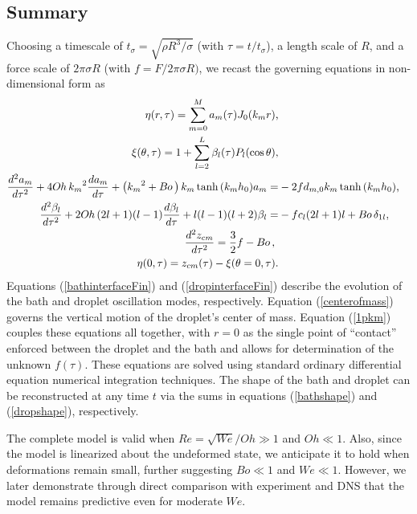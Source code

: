 \documentclass{jfm}
\begin{document}
\subsection{Summary}
Choosing a timescale of $t_{\sigma}=\sqrt{\rho R^3/\sigma}$ (with $\tau = t/t_{\sigma}$), a length scale of $R$, and a force scale of $2 \pi \sigma R$ (with $f = F / 2 \pi \sigma R )$, we  recast the governing equations in non-dimensional form as 
\begin{align}
    \eta(r,\tau) = \sum_{m=0}^{M} a_m(\tau) J_0(k_m r) \text{,} \label{bathshape} \\
    \xi(\theta,\tau) = 1 + \sum_{l=2}^{L}\beta_l(\tau) P_l(\cos{\theta}) \text{,} \label{dropshape} \\
    \frac{d^2 {a_m}}{d\tau^2} + 4 {O\kern-0.04em h\,} {k_m}^2 \frac{d {a_m}}{d\tau} + \left( {k_m}^2 + B\kern-0.04em o\, \right){k_m}\tanh{({k_m} {h_0})}{a_m} =& -2{f} d_{m,0} {k_m} \tanh{({k_m} {h_0})} \text{,} \label{bathinterfaceFin} \\
    \frac{d^2 {\beta_l}}{d\tau^2} + 2 O\kern-0.04em h\, (2l+1)(l-1) \frac{d {\beta_l}}{d\tau} + l(l-1)(l+2) {\beta_l} =& - {f} c_{l} (2l+1)l + B\kern-0.04em o\,\delta_{1l} \text{,} \label{dropinterfaceFin} \\
        \frac{d^2 z_{cm}}{d \tau^2} = \frac{3}{2} f - B\kern-0.04em o\, \text{, } \label{centerofmass}\\
    \eta(0,\tau) =  {z}_{cm}(\tau) -  {\xi}(\theta=0,\tau)  \text{.} \label{1pkm} 
\end{align}
Equations (\ref{bathinterfaceFin}) and (\ref{dropinterfaceFin}) describe the evolution of the bath and droplet oscillation modes, respectively. Equation (\ref{centerofmass}) governs the vertical motion of the droplet's center of mass.  Equation (\ref{1pkm}) couples these equations all together, with $r=0$ as the single point of ``contact'' enforced between the droplet and the bath and allows for determination of the unknown $f(\tau)$. These equations are solved using standard ordinary differential equation numerical integration techniques.  The shape of the bath and droplet can be reconstructed at any time $t$ via the sums in equations (\ref{bathshape}) and (\ref{dropshape}), respectively.

The complete model is valid when $Re = \sqrt{We}/Oh \gg 1$ and $Oh\ll1$.  Also, since the model is linearized about the undeformed state, we anticipate it to hold when deformations remain small, further suggesting $Bo\ll1$ and $We\ll1$.  However, we later demonstrate through direct comparison with experiment and DNS that the model remains predictive even for moderate $We$. 
\end{document}
